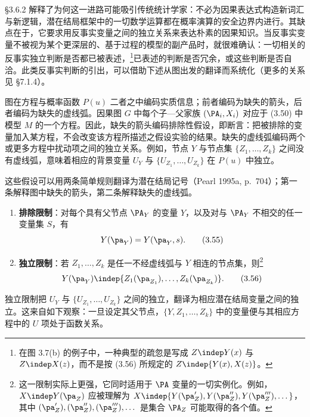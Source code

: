 \S 3.6.2 解释了为何这一进路可能吸引传统统计学家：不必为因果表达式构造新词汇与新逻辑，潜在结局框架中的一切数学运算都在概率演算的安全边界内进行。其缺点在于，它要求用反事实变量之间的独立关系来表达朴素的因果知识。当反事实变量不被视为某个更深层的、基于过程的模型的副产品时，就很难确认：一切相关的反事实独立判断是否都已被表述，\footnote{在图 3.7(b) 的例子中，一种典型的疏忽是写成 $Z\indep Y(x)$ 与 $Z\indep X(z)$，而不是按 \textup{(3.56)} 所规定的 $Z\indep\{Y(x),X(z)\}$。}已表述的判断是否冗余，或这些判断是否自洽。此类反事实判断的引出，可以借助下述从图出发的翻译而系统化（更多的关系见 \S 7.1.4）。

图在方程与概率函数 $P(u)$ 二者之中编码实质信息；前者编码为缺失的箭头，后者编码为缺失的虚线弧。因果图 $G$ 中每个子—父家族 $(\PA_i,X_i)$ 对应于 \textup{(3.50)} 中模型 $M$ 的一个方程。因此，缺失的箭头编码排除性假设，即断言：把被排除的变量加入某方程，不会改变该方程所描述之假设实验的结果。缺失的虚线弧编码两个或更多方程中扰动项之间的独立关系。例如，节点 $Y$ 与节点集 $\{Z_1,\dots,Z_k\}$ 之间没有虚线弧，意味着相应的背景变量 $U_Y$ 与 $\{U_{Z_1},\dots,U_{Z_k}\}$ 在 $P(u)$ 中独立。

这些假设可以用两条简单规则翻译为潜在结局记号（Pearl 1995a, p.~704）；第一条解释图中缺失的箭头，第二条解释缺失的虚线弧。
\begin{enumerate}[label=\arabic*.,leftmargin=1.8em]
\item \textbf{排除限制}：对每个具有父节点 $\PA_Y$ 的变量 $Y$，以及对与 $\PA_Y$ 不相交的任一变量集 $S$，有
\begin{equation}
Y(\pa_Y)=Y(\pa_Y,s). \tag{3.55}
\end{equation}
\item \textbf{独立限制}：若 $Z_1,\dots,Z_k$ 是任一不经虚线弧与 $Y$ 相连的节点集，则\footnote{这一限制实际上更强，它同时适用于 $\PA$ 变量的一切实例化。例如，$X\indep Y(\pa_Z)$ 应被理解为 $X\indep\{Y(\pa'_Z),Y(\pa''_Z),Y(\pa'''_Z),\dots\}$，其中 $(\pa'_Z),(\pa''_Z),(\pa'''_Z),\dots$ 是集合 $\PA_Z$ 可能取得的各个值。}
\begin{equation}
Y(\pa_Y)\indep\{Z_1(\pa_{Z_1}),\dots,Z_k(\pa_{Z_k})\}. \tag{3.56}
\end{equation}
\end{enumerate}
独立限制把 $U_Y$ 与 $\{U_{Z_1},\dots,U_{Z_k}\}$ 之间的独立，翻译为相应潜在结局变量之间的独立。这来自如下观察：一旦设定其父节点，$\{Y,Z_1,\dots,Z_k\}$ 中的变量便与其相应方程中的 $U$ 项处于函数关系。

